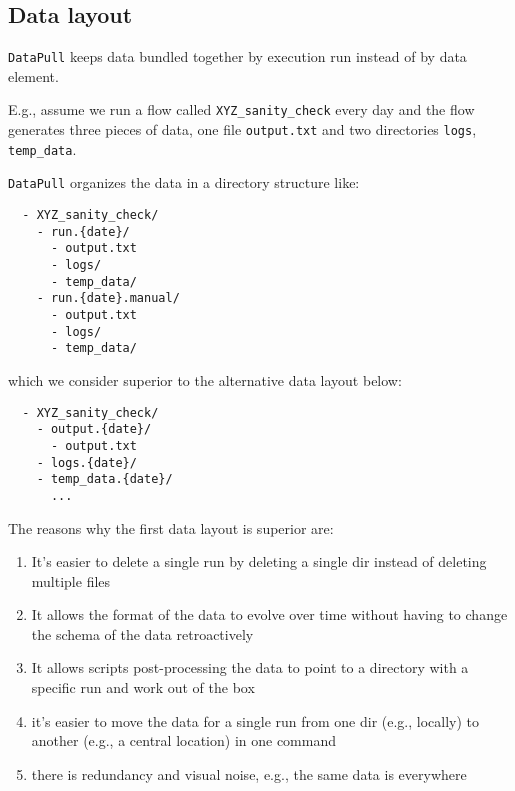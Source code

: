 \documentclass[11pt, reqno]{amsart}
\theoremstyle{definition}
\theoremstyle{remark}
\begin{document}
  \subsection{Data layout}

  \verb|DataPull| keeps data bundled together by execution run instead of by data
  element.

  E.g., assume we run a flow called \verb|XYZ_sanity_check| every day and the flow
  generates three pieces of data, one file \verb|output.txt| and two directories
  \verb|logs|, \verb|temp_data|.

  \verb|DataPull| organizes the data in a directory structure like:

  \begin{verbatim}
  - XYZ_sanity_check/
    - run.{date}/
      - output.txt
      - logs/
      - temp_data/
    - run.{date}.manual/
      - output.txt
      - logs/
      - temp_data/
  \end{verbatim}

  which we consider superior to the alternative data layout below:

  \begin{verbatim}
  - XYZ_sanity_check/
    - output.{date}/
      - output.txt
    - logs.{date}/
    - temp_data.{date}/
      ...
  \end{verbatim}

  The reasons why the first data layout is superior are:

  \begin{enumerate}
    \item It's easier to delete a single run by deleting a single dir instead of
      deleting multiple files

    \item It allows the format of the data to evolve over time without having to
      change the schema of the data retroactively

    \item It allows scripts post-processing the data to point to a directory with
      a specific run and work out of the box

    \item it's easier to move the data for a single run from one dir (e.g.,
      locally) to another (e.g., a central location) in one command

    \item there is redundancy and visual noise, e.g., the same data is
      everywhere
  \end{enumerate}
\end{document}
